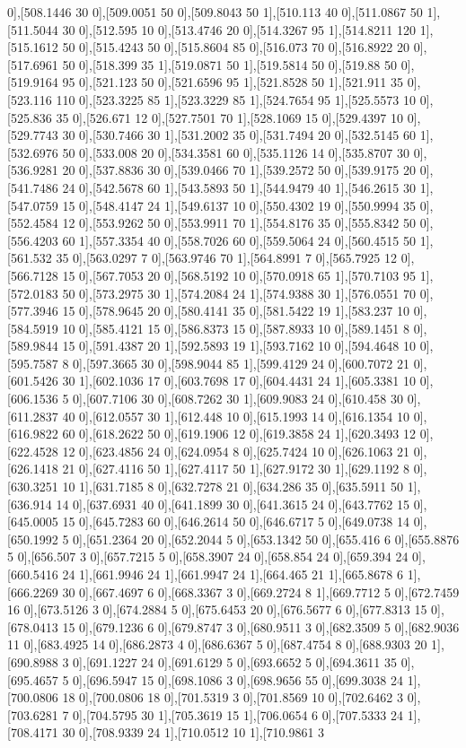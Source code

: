 {0],[508.1446 30 0],[509.0051 50 0],[509.8043 50 1],[510.113 40 0],[511.0867 50 1],[511.5044 30 0],[512.595 10 0],[513.4746 20 0],[514.3267 95 1],[514.8211 120 1],[515.1612 50 0],[515.4243 50 0],[515.8604 85 0],[516.073 70 0],[516.8922 20 0],[517.6961 50 0],[518.399 35 1],[519.0871 50 1],[519.5814 50 0],[519.88 50 0],[519.9164 95 0],[521.123 50 0],[521.6596 95 1],[521.8528 50 1],[521.911 35 0],[523.116 110 0],[523.3225 85 1],[523.3229 85 1],[524.7654 95 1],[525.5573 10 0],[525.836 35 0],[526.671 12 0],[527.7501 70 1],[528.1069 15 0],[529.4397 10 0],[529.7743 30 0],[530.7466 30 1],[531.2002 35 0],[531.7494 20 0],[532.5145 60 1],[532.6976 50 0],[533.008 20 0],[534.3581 60 0],[535.1126 14 0],[535.8707 30 0],[536.9281 20 0],[537.8836 30 0],[539.0466 70 1],[539.2572 50 0],[539.9175 20 0],[541.7486 24 0],[542.5678 60 1],[543.5893 50 1],[544.9479 40 1],[546.2615 30 1],[547.0759 15 0],[548.4147 24 1],[549.6137 10 0],[550.4302 19 0],[550.9994 35 0],[552.4584 12 0],[553.9262 50 0],[553.9911 70 1],[554.8176 35 0],[555.8342 50 0],[556.4203 60 1],[557.3354 40 0],[558.7026 60 0],[559.5064 24 0],[560.4515 50 1],[561.532 35 0],[563.0297 7 0],[563.9746 70 1],[564.8991 7 0],[565.7925 12 0],[566.7128 15 0],[567.7053 20 0],[568.5192 10 0],[570.0918 65 1],[570.7103 95 1],[572.0183 50 0],[573.2975 30 1],[574.2084 24 1],[574.9388 30 1],[576.0551 70 0],[577.3946 15 0],[578.9645 20 0],[580.4141 35 0],[581.5422 19 1],[583.237 10 0],[584.5919 10 0],[585.4121 15 0],[586.8373 15 0],[587.8933 10 0],[589.1451 8 0],[589.9844 15 0],[591.4387 20 1],[592.5893 19 1],[593.7162 10 0],[594.4648 10 0],[595.7587 8 0],[597.3665 30 0],[598.9044 85 1],[599.4129 24 0],[600.7072 21 0],[601.5426 30 1],[602.1036 17 0],[603.7698 17 0],[604.4431 24 1],[605.3381 10 0],[606.1536 5 0],[607.7106 30 0],[608.7262 30 1],[609.9083 24 0],[610.458 30 0],[611.2837 40 0],[612.0557 30 1],[612.448 10 0],[615.1993 14 0],[616.1354 10 0],[616.9822 60 0],[618.2622 50 0],[619.1906 12 0],[619.3858 24 1],[620.3493 12 0],[622.4528 12 0],[623.4856 24 0],[624.0954 8 0],[625.7424 10 0],[626.1063 21 0],[626.1418 21 0],[627.4116 50 1],[627.4117 50 1],[627.9172 30 1],[629.1192 8 0],[630.3251 10 1],[631.7185 8 0],[632.7278 21 0],[634.286 35 0],[635.5911 50 1],[636.914 14 0],[637.6931 40 0],[641.1899 30 0],[641.3615 24 0],[643.7762 15 0],[645.0005 15 0],[645.7283 60 0],[646.2614 50 0],[646.6717 5 0],[649.0738 14 0],[650.1992 5 0],[651.2364 20 0],[652.2044 5 0],[653.1342 50 0],[655.416 6 0],[655.8876 5 0],[656.507 3 0],[657.7215 5 0],[658.3907 24 0],[658.854 24 0],[659.394 24 0],[660.5416 24 1],[661.9946 24 1],[661.9947 24 1],[664.465 21 1],[665.8678 6 1],[666.2269 30 0],[667.4697 6 0],[668.3367 3 0],[669.2724 8 1],[669.7712 5 0],[672.7459 16 0],[673.5126 3 0],[674.2884 5 0],[675.6453 20 0],[676.5677 6 0],[677.8313 15 0],[678.0413 15 0],[679.1236 6 0],[679.8747 3 0],[680.9511 3 0],[682.3509 5 0],[682.9036 11 0],[683.4925 14 0],[686.2873 4 0],[686.6367 5 0],[687.4754 8 0],[688.9303 20 1],[690.8988 3 0],[691.1227 24 0],[691.6129 5 0],[693.6652 5 0],[694.3611 35 0],[695.4657 5 0],[696.5947 15 0],[698.1086 3 0],[698.9656 55 0],[699.3038 24 1],[700.0806 18 0],[700.0806 18 0],[701.5319 3 0],[701.8569 10 0],[702.6462 3 0],[703.6281 7 0],[704.5795 30 1],[705.3619 15 1],[706.0654 6 0],[707.5333 24 1],[708.4171 30 0],[708.9339 24 1],[710.0512 10 1],[710.9861 3 }
